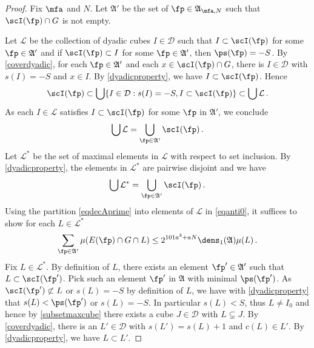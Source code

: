 \begin{proof}
{Fix $\mfa$ and $N$. Let
$\mathfrak{A}'$ be the set of $\fp\in\mathfrak{A}_{\mfa,N}$ such that $\scI(\fp)\cap G$ is not empty.}


   Let $\mathcal{L}$ be the collection of dyadic cubes $I\in\mathcal{D}$ such that $I\subset \scI(\fp)$ for some $\fp\in\mathfrak{A}'$ and if $\scI(\fp)\subset I$ for some $\fp\in\mathfrak{A}'$, then $\ps(\fp)=-S$. By \eqref{coverdyadic}, for each $\fp \in \mathfrak{A}'$
   and each $x\in \scI(\fp)\cap G$, there is $I\in \mathcal{D}$ with $s(I)=-S$ and $x\in I$. By \eqref{dyadicproperty},
   we have $I\subset \scI(\fp)$. Hence
   \begin{equation}
       \scI(\fp)\subset \bigcup\{I\in \mathcal{D}: s(I)=-S, I\subset \scI(\fp)\}\subset \bigcup \mathcal{L}\, .
   \end{equation}
As each $I\in \mathcal{L}$ satisfies $I\subset \scI(\fp)$ for some $\fp$ in $\mathfrak{A'}$, we conclude
     \begin{equation}
\bigcup\mathcal{L}=\bigcup_{\fp \in \mathfrak{A}'}\scI(\fp)\, .
   \end{equation}
Let $\mathcal{L}^*$ be the set of maximal elements in $\mathcal{L}$ with respect to set inclusion.
By \eqref{dyadicproperty}, the elements in $\mathcal{L}^*$ are pairwise disjoint and we have
 \begin{equation}\label{eqdecAprime}
\bigcup\mathcal{L}^*=\bigcup_{\fp \in \mathfrak{A}'}\scI(\fp)\, .
   \end{equation}
Using the partition \eqref{eqdecAprime} into elements of $\mathcal{L}$ in \eqref{eqanti0}, it suffices to show for each $L\in \mathcal{L}^*$
\begin{equation}\label{eqanti0}
    \sum_{\fp\in\mathfrak{A}'}\mu(E(\fp)\cap G \cap L)
    \le
    2^{101a^3+aN}
    \dens_1(\mathfrak{A})\mu(L)\,.
\end{equation}
Fix $L\in \mathcal{L}^*$.
By definition of $L$, there exists an element $\fp'\in \mathfrak{A}'$ such that $L\subset \scI(\fp')$. Pick such an element $\fp
'$
in $\mathfrak{A}$ with minimal $\ps(\fp')$. As $\scI(\fp')\not \subset L$ or $s(L) = -S$ by definition of $L$, we have
with \eqref{dyadicproperty} that $s(L)< \ps(\fp')$ or $s(L) = -S$. In particular $s(L)<S$, thus $L \ne I_0$ and hence by \eqref{subsetmaxcube}
there exists a cube $J \in \mathcal{D}$ with $L \subsetneq J$.
By \eqref{coverdyadic}, there is an
$L'\in \mathcal{D}$ with $s(L')=s(L)+1$ and $c(L)\in L'$. By \eqref{dyadicproperty}, we have
$L\subset L'$.


\end{proof}
